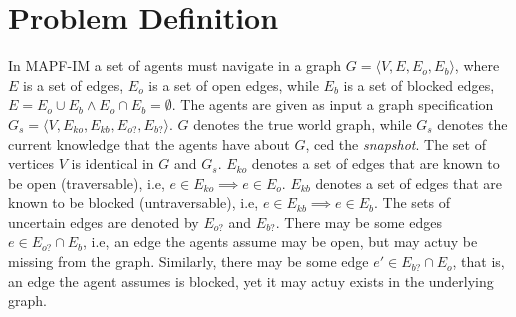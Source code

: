 \documentclass[letterpaper]{article} %
\def\
UrlFont{\rm}  %
\newcommand{\eo}{E_{o}} %
\newcommand{\eb}{E_{b}} %
\newcommand{\eko}{E_{ko}} %
\newcommand{\ekb}{E_{kb}} %
\newcommand{\eao}{E_{o?}} %
\newcommand{\eab}{E_{b?}} %
\theoremstyle{definition}
\begin{document}
\section{Problem Definition}


In MAPF-IM a set of agents must navigate in a graph $G=\langle V, E, \eo, \eb \rangle$, where $E$ is a set of edges, $\eo$ is a set of open edges, while $\eb$ is a set of blocked edges, $E=\eo \cup \eb \land \eo \cap \eb = \emptyset$. The agents are given as input a graph specification $G_s=\langle V, \eko, \ekb, \eao, \eab \rangle$. $G$ denotes the true world graph, while $G_s$ denotes the current knowledge that the agents have about $G$, ced the {\em snapshot}. The set of vertices $V$ is identical in $G$ and $G_s$. $\eko$ denotes a set of edges that are known to be open (traversable), i.e, $ e \in \eko \implies e \in \eo$. $\ekb$ denotes a set of edges that are known to be blocked (untraversable), i.e, $e \in \ekb \implies e \in \eb$.
The sets of uncertain edges are denoted by $\eao$ and $\eab$. There may be some edges $e\in \eao \cap \eb$, i.e, an edge the agents assume may be open, but may actuy be missing from the graph. Similarly, there may be some edge $e' \in \eab \cap \eo$, that is, an edge the agent assumes is blocked, yet it may actuy exists in the underlying graph.
\end{document}

